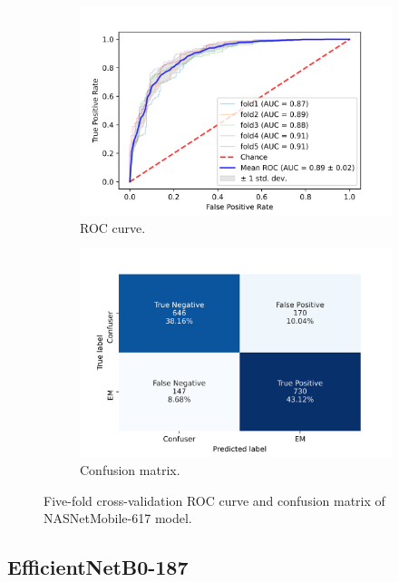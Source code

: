 \begin{figure}[h!]
	\centering
	\begin{subfigure}[b]{0.49\textwidth}
		\centering
		\includegraphics[width=\textwidth,keepaspectratio]{images/Supplement4/image163.png}
		\caption{ROC curve.}
	\end{subfigure}
	\hfill
	\begin{subfigure}[b]{0.49\textwidth}
		\centering
		\includegraphics[width=\textwidth,keepaspectratio]{images/Supplement4/image168.png}
		\caption{Confusion matrix.}
	\end{subfigure}
	\caption{Five-fold cross-validation ROC curve and confusion matrix of NASNetMobile-617 model.}
\end{figure}

\vfill\clearpage
\subsection{EfficientNetB0-187}

